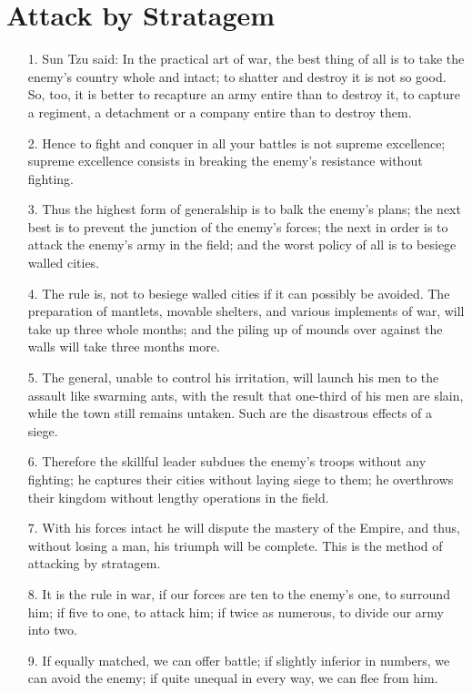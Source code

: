\documentclass[11pt,openany]{memoir}
\newcommand{\enumeratemargin}{1.30em}
\begin{document}
\chapter{Attack by Stratagem}
\begin{enumerate}[leftmargin=\enumeratemargin]
\item[1.] Sun Tzu said: In the practical art of war, the best thing of all is to take the enemy's country whole and intact; to shatter and destroy it is not so good. So, too, it is better to recapture an army entire than to destroy it, to capture a regiment, a detachment or a company entire than to destroy them.
\item[2.] Hence to fight and conquer in all your battles is not supreme excellence; supreme excellence consists in breaking the enemy's resistance without fighting.
\item[3.] Thus the highest form of generalship is to balk the enemy's plans; the next best is to prevent the junction of the enemy's forces; the next in order is to attack the enemy's army in the field; and the worst policy of all is to besiege walled cities.
\item[4.] The rule is, not to besiege walled cities if it can possibly be avoided. The preparation of mantlets, movable shelters, and various implements of war, will take up three whole months; and the piling up of mounds over against the walls will take three months more.
\item[5.] The general, unable to control his irritation, will launch his men to the assault like swarming ants, with the result that one-third of his men are slain, while the town still remains untaken. Such are the disastrous effects of a siege.
\item[6.] Therefore the skillful leader subdues the enemy's troops without any fighting; he captures their cities without laying siege to them; he overthrows their kingdom without lengthy operations in the field.
\item[7.] With his forces intact he will dispute the mastery of the Empire, and thus, without losing a man, his triumph will be complete. This is the method of attacking by stratagem.
\item[8.] It is the rule in war, if our forces are ten to the enemy's one, to surround him; if five to one, to attack him; if twice as numerous, to divide our army into two.
\item[9.] If equally matched, we can offer battle; if slightly inferior in numbers, we can avoid the enemy; if quite unequal in every way, we can flee from him.

\end{enumerate}
\end{document}
